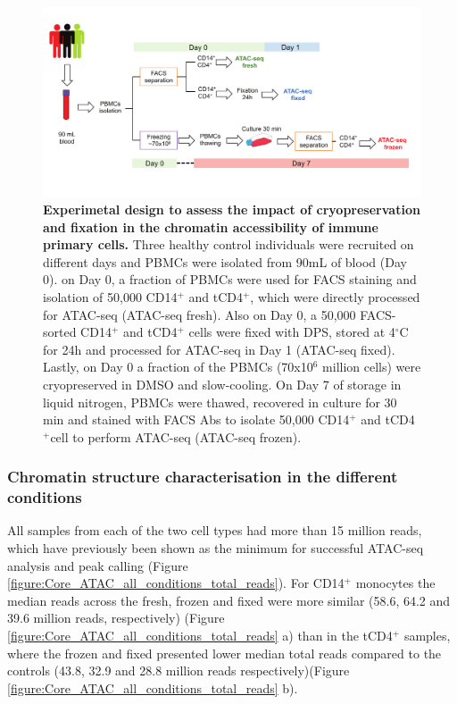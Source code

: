 \begin{landscape}
\begin{figure}[H]
\centering
\includegraphics[width=1.2\textwidth]{./Results1/pdfs/Chapter3_core_experimental_design}
\caption[Experimetal design to assess the impact of cryopreservation and fixation in the chromatin accessibility of immune primary cells.]{\textbf{Experimetal design to assess the impact of cryopreservation and fixation in the chromatin accessibility of immune primary cells.} Three healthy control individuals were recruited on different days and PBMCs were isolated from 90mL of blood (Day 0). on Day 0, a fraction of PBMCs were used for FACS staining and isolation of 50,000 CD14$^+$ and tCD4$^+$, which were directly processed for ATAC-seq (ATAC-seq fresh). Also on Day 0, a 50,000 FACS-sorted CD14$^+$ and tCD4$^+$ cells were fixed with DPS, stored at 4{$^\circ$}C for 24h and processed for ATAC-seq in Day 1 (ATAC-seq fixed). Lastly, on Day 0 a fraction of the PBMCs (70x10$^6$ million cells) were cryopreserved in DMSO and slow-cooling. On Day 7 of storage in liquid nitrogen, PBMCs were thawed, recovered in culture for 30 min and stained with FACS Abs to isolate 50,000 CD14$^+$ and tCD4$^+$cell to perform ATAC-seq (ATAC-seq frozen).}
\label{figure:Core_experimental_design}
\end{figure}
\end{landscape}



\subsubsection{Chromatin structure characterisation in the different conditions}

All samples from each of the two cell types had more than 15 million reads, which have previously been shown as the minimum for successful ATAC-seq analysis and peak calling (Figure \ref{figure:Core_ATAC_all_conditions_total_reads}). For CD14$^+$ monocytes the median reads across the fresh, frozen and fixed were more similar (58.6, 64.2 and 39.6 million reads, respectively) (Figure \ref{figure:Core_ATAC_all_conditions_total_reads} a) than in the tCD4$^+$ samples, where the frozen and fixed presented lower median total reads compared to the controls (43.8, 32.9 and 28.8 million reads respectively)(Figure \ref{figure:Core_ATAC_all_conditions_total_reads} b).

